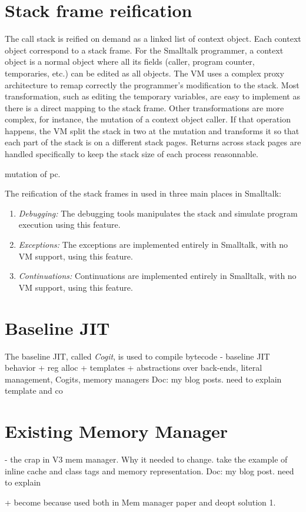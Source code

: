 \documentclass[a4paper,12pt,twoside]{../includes/ThesisStyle}
\begin{document}
\section{Stack frame reification}

The call stack is reified on demand as a linked list of context object. Each context object correspond to a stack frame. For the Smalltalk programmer, a context object is a normal object where all its fields (caller, program counter, temporaries, etc.) can be edited as all objects. The VM uses a complex proxy architecture to remap correctly the programmer's modification to the stack. Most transformation, such as editing the temporary variables, are easy to implement as there is a direct mapping to the stack frame. Other transformations are more complex, for instance, the mutation of a context object caller. If that operation happens, the VM split the stack in two at the mutation and transforms it so that each part of the stack is on a different stack pages. Returns across stack pages are handled specifically to keep the stack size of each process reasonnable.

mutation of pc.

The reification of the stack frames in used in three main places in Smalltalk:
\begin{enumerate}
	\item \emph{Debugging: } The debugging tools manipulates the stack and simulate program execution using this feature.
	\item \emph{Exceptions: } The exceptions are implemented entirely in Smalltalk, with no VM support, using this feature.
	\item \emph{Continuations: } Continuations are implemented entirely in Smalltalk, with no VM support, using this feature.
\end{enumerate}

\section{Baseline JIT}

The baseline JIT, called \emph{Cogit}, is used to compile bytecode
- baseline JIT behavior + reg alloc + templates + abstractions over back-ends, literal management, Cogits, memory managers
Doc: my blog posts. need to explain template and co

\section{Existing Memory Manager}
- the crap in V3 mem manager. Why it needed to change.
take the example of inline cache and class tags and memory representation.
Doc: my blog post. need to explain


+ become because used both in Mem manager paper and deopt solution 1.

\ifx\wholebook\relax\else
    
\end{document}
